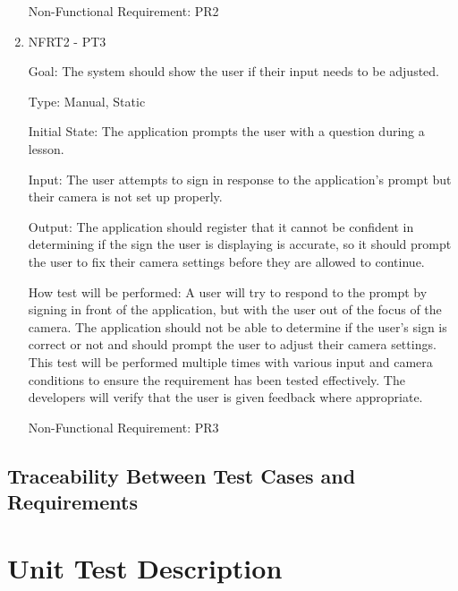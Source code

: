 \documentclass[12pt, titlepage]{article}
\begin{document}
\begin{enumerate}
Non-Functional Requirement: PR2

\item{NFRT2 - PT3}

Goal: The system should show the user if their input needs to be adjusted. 

Type: Manual, Static
					
Initial State: The application prompts the user with a question during a lesson.
					
Input: The user attempts to sign in response to the application's prompt but their camera is not set up properly.
					
Output: The application should register that it cannot be confident in determining if the sign the user is displaying is accurate, so it should prompt the user to fix their camera settings before they are allowed to continue.
					
How test will be performed: A user will try to respond to the prompt by signing in front of the application, but with the user out of the focus of the camera. The application should not be able to determine if the user's sign is correct or not and should prompt the user to adjust their camera settings. This test will be performed multiple times with various input and camera conditions to ensure the requirement has been tested effectively. The developers will verify that the user is given feedback where appropriate. 

Non-Functional Requirement: PR3

\end{enumerate}

\subsection{Traceability Between Test Cases and Requirements}


\section{Unit Test Description}



\end{document}
